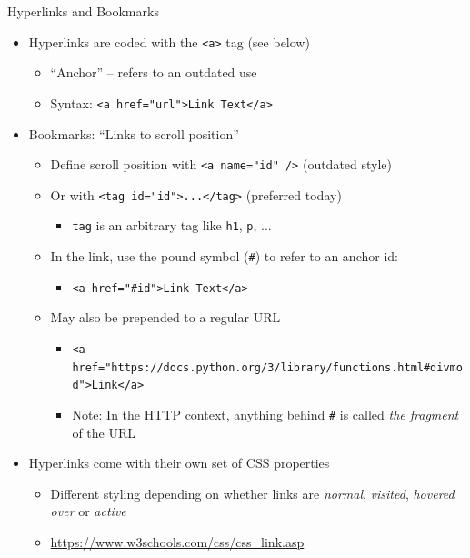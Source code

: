 
\begin{frame}[fragile]{Hyperlinks and Bookmarks}
%
\begin{itemize}
\item Hyperlinks are coded with the \texttt{<a>} tag (see below)
	\begin{itemize}
	\item \enquote{Anchor} -- refers to an outdated use
	\item Syntax: \texttt{<a href="url">Link Text</a>}
	\end{itemize}
\pause
\item Bookmarks: \enquote{Links to scroll position}
	\begin{itemize}
	\item Define scroll position with \texttt{<a name="id" />} (outdated style)
	\item Or with \texttt{<tag id="id">...</tag>} (preferred today)
		\begin{itemize}
		\item \texttt{tag} is an arbitrary tag like \texttt{h1}, \texttt{p}, ...
		\end{itemize}
	\item In the link, use the pound symbol (\texttt{\#}) to refer to an anchor id:
		\begin{itemize}
		\item \texttt{<a href="#id">Link Text</a>}
		\end{itemize}
	\item May also be prepended to a regular URL
		\begin{itemize}
		\item \texttt{<a href="https://docs.python.org/3/library/functions.html#divmod">Link</a>}
		\item Note: In the HTTP context, anything behind \texttt{\#} is called \emph{the fragment} of the URL
		\end{itemize}
	\end{itemize}
\pause
\item Hyperlinks come with their own set of CSS properties
	\begin{itemize}
	\item Different styling depending on whether links are \emph{normal}, \emph{visited}, \emph{hovered over} or \emph{active}
	\item \url{https://www.w3schools.com/css/css_link.asp}
	\end{itemize}
\end{itemize}
%
\end{frame}

